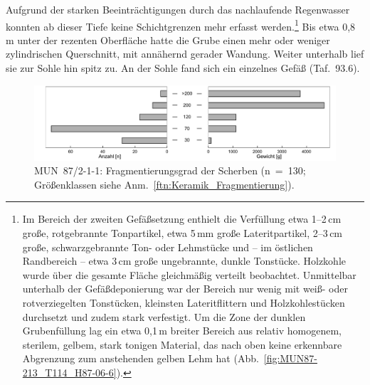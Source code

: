 Aufgrund der starken Beeinträchtigungen durch das nachlaufende Regenwasser konnten ab dieser Tiefe keine Schichtgrenzen mehr erfasst werden.\footnote{Im Bereich der zweiten Gefäßsetzung enthielt die Verfüllung etwa 1--2\,cm große, rotgebrannte Tonpartikel, etwa 5\,mm große Lateritpartikel, 2--3\,cm große, schwarzgebrannte Ton- oder Lehmstücke und -- im östlichen Randbereich -- etwa 3\,cm große ungebrannte, dunkle Tonstücke. Holzkohle wurde über die gesamte Fläche gleichmäßig verteilt beobachtet. Unmittelbar unterhalb der Gefäßdeponierung war der Bereich nur wenig mit weiß- oder rotverziegelten Tonstücken, kleinsten Lateritflittern und Holzkohlestücken durchsetzt und zudem stark verfestigt. Um die Zone der dunklen Grubenfüllung lag ein etwa 0,1\,m breiter Bereich aus relativ homogenem, sterilem, gelbem, stark tonigen Material, das nach oben keine erkennbare Abgrenzung zum anstehenden gelben Lehm hat (Abb.~\ref{fig:MUN87-213_T114_H87-06-6}).} Bis etwa 0,8\,m unter der rezenten Oberfläche hatte die Grube einen mehr oder weniger zylindrischen Querschnitt, mit annähernd gerader Wandung. Weiter unterhalb lief sie zur Sohle hin spitz zu. An der Sohle fand sich ein einzelnes Gefäß (Taf.~93.6). 

\begin{table}[tb!]
	\centering{\footnotesize
		}
	\caption{MUN~87/1-2-3: Anteil verschiedener Fundmaterialien.}
	\label{tab:MUN87-2-1-3_Funde}
\end{table}

\begin{figure}[tb!]
	\centering
	\includegraphics[width=\textwidth]{fig/9-14_MUN87-213_Fragmentierung_2.pdf}
	\caption{MUN~87/2-1-1: Fragmentierungsgrad der Scherben (n~=~130; Größenklassen siehe Anm.~\ref{ftn:Keramik_Fragmentierung}).}
	\label{fig:MUN87-213_Fragmentierung}
\end{figure}

